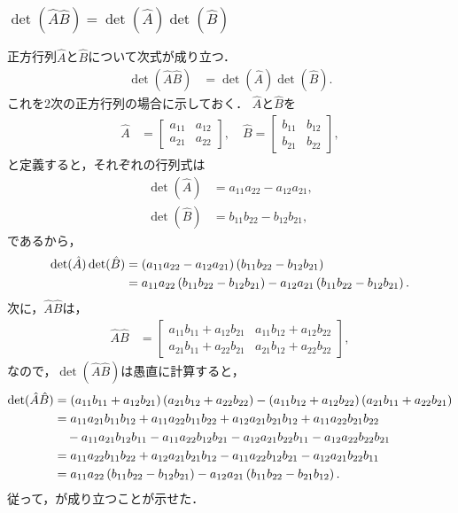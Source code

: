 \subsubsection{$\det(\hat{A}\hat{B}) = \det(\hat{A})\det(\hat{B})$}
%
正方行列$\hat{A}$と$\hat{B}$について次式が成り立つ．
%
\begin{align}
  \det(\hat{A}\hat{B}) & = \det(\hat{A}) \det(\hat{B}). \label{LA:det(AB)=det(A)det(B)_2D}
\end{align}
%
これを2次の正方行列の場合に示しておく．
$\hat{A}$と$\hat{B}$を
%
\begin{align}
\hat{A} & =\left[\begin{array}{cc}
a_{11} & a_{12}\\
a_{21} & a_{22}
\end{array}\right],\quad\hat{B}=\left[\begin{array}{cc}
b_{11} & b_{12}\\
b_{21} & b_{22}
\end{array}\right],
\end{align}
%
と定義すると，それぞれの行列式は
%
\begin{align}
\det(\hat{A}) & =a_{11}a_{22}-a_{12}a_{21},\\
\det(\hat{B}) & =b_{11}b_{22}-b_{12}b_{21}, 
\end{align}
%
であるから，
%
\begin{align}
\det(\hat{A})\det(\hat{B}) & =\left(a_{11}a_{22}-a_{12}a_{21}\right)\left(b_{11}b_{22}-b_{12}b_{21}\right)\notag\\
 & =a_{11}a_{22}\left(b_{11}b_{22}-b_{12}b_{21}\right)-a_{12}a_{21}\left(b_{11}b_{22}-b_{12}b_{21}\right).
\end{align}
%
次に，$\hat{A}\hat{B}$は，
%
\begin{align}
\hat{A}\hat{B} & =\left[
\begin{array}{cc}
a_{11}b_{11}+a_{12}b_{21} & a_{11}b_{12}+a_{12}b_{22}\\
a_{21}b_{11}+a_{22}b_{21} & a_{21}b_{12}+a_{22}b_{22}
\end{array}
\right], 
\end{align}
%
なので，$\det(\hat{A}\hat{B})$は愚直に計算すると，
\begin{align}
\det(\hat{A}\hat{B}) & =\left(a_{11}b_{11}+a_{12}b_{21}\right)\left(a_{21}b_{12}+a_{22}b_{22}\right)-\left(a_{11}b_{12}+a_{12}b_{22}\right)\left(a_{21}b_{11}+a_{22}b_{21}\right)\notag\\
 & =a_{11}a_{21}b_{11}b_{12}+a_{11}a_{22}b_{11}b_{22}+a_{12}a_{21}b_{21}b_{12}+a_{11}a_{22}b_{21}b_{22}\notag\\
 & \quad-a_{11}a_{21}b_{12}b_{11}-a_{11}a_{22}b_{12}b_{21}-a_{12}a_{21}b_{22}b_{11}-a_{12}a_{22}b_{22}b_{21}\notag\\
 & =a_{11}a_{22}b_{11}b_{22}+a_{12}a_{21}b_{21}b_{12}-a_{11}a_{22}b_{12}b_{21}-a_{12}a_{21}b_{22}b_{11}\notag\\
 & =a_{11}a_{22}\left(b_{11}b_{22}-b_{12}b_{21}\right)-a_{12}a_{21}\left(b_{11}b_{22}-b_{21}b_{12}\right).
\end{align}
%
従って，が成り立つことが示せた．
%
